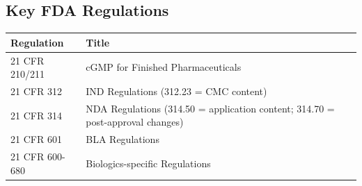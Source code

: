 \documentclass[
  11pt,
  a4paper,
]{report}
\begin{document}
\hypertarget{key-fda-regulations}{%
\subsection{Key FDA Regulations}\label{key-fda-regulations}}

\begin{longtable}[]{@{}ll@{}}
\toprule
\begin{minipage}[b]{0.57\columnwidth}\raggedright
Regulation\strut
\end{minipage} & \begin{minipage}[b]{0.37\columnwidth}\raggedright
Title\strut
\end{minipage}\tabularnewline
\midrule
\endhead
\begin{minipage}[t]{0.57\columnwidth}\raggedright
21 CFR 210/211\strut
\end{minipage} & \begin{minipage}[t]{0.37\columnwidth}\raggedright
cGMP for Finished Pharmaceuticals\strut
\end{minipage}\tabularnewline
\begin{minipage}[t]{0.57\columnwidth}\raggedright
21 CFR 312\strut
\end{minipage} & \begin{minipage}[t]{0.37\columnwidth}\raggedright
IND Regulations (312.23 = CMC content)\strut
\end{minipage}\tabularnewline
\begin{minipage}[t]{0.57\columnwidth}\raggedright
21 CFR 314\strut
\end{minipage} & \begin{minipage}[t]{0.37\columnwidth}\raggedright
NDA Regulations (314.50 = application content; 314.70 = post-approval
changes)\strut
\end{minipage}\tabularnewline
\begin{minipage}[t]{0.57\columnwidth}\raggedright
21 CFR 601\strut
\end{minipage} & \begin{minipage}[t]{0.37\columnwidth}\raggedright
BLA Regulations\strut
\end{minipage}\tabularnewline
\begin{minipage}[t]{0.57\columnwidth}\raggedright
21 CFR 600-680\strut
\end{minipage} & \begin{minipage}[t]{0.37\columnwidth}\raggedright
Biologics-specific Regulations\strut
\end{minipage}\tabularnewline
\bottomrule
\end{longtable}
\end{document}
